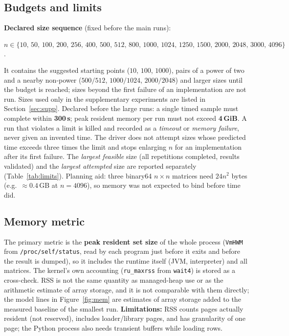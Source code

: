\subsection{Budgets and limits}
\label{sec:budgets}
\textbf{Declared size sequence} (fixed before the main runs):
\begin{center}$n\in\{10,\,50,\,100,\,200,\,256,\,400,\,500,\,512,\,800,\,1000,\,1024,\,1250,\,1500,\,2000,\,2048,\,3000,\,4096\}$.\end{center}
It contains the suggested starting points ($10$, $100$, $1000$), pairs of a power of two and a nearby non-power ($500/512$, $1000/1024$, $2000/2048$) and
larger sizes until the budget is reached; sizes beyond the first failure of an implementation are not run. Sizes used only in the supplementary experiments are listed in Section~\ref{sec:supp}.
Declared before the large runs: a single timed sample must complete within \textbf{300\,s}; peak resident memory per
run must not exceed \textbf{4\,GiB}. A run that violates a limit is killed and recorded as a \emph{timeout} or
\emph{memory failure}, never given an invented time. The driver does not attempt sizes whose predicted time exceeds
three times the limit and stops enlarging $n$ for an implementation after its first failure. The \emph{largest
feasible} size (all repetitions completed, results validated) and the \emph{largest attempted} size are reported
separately (Table~\ref{tab:limits}). Planning aid: three binary64 $n\times n$ matrices need $24n^2$ bytes
(e.g.\ $\approx 0.4$\,GB at $n=4096$), so memory was not expected to bind before time did.

\subsection{Memory metric}
The primary metric is the \textbf{peak resident set size} of the whole process (\texttt{VmHWM} from
\texttt{/proc/self/status}, read by each program just before it exits and before the result is dumped), so it
includes the runtime itself (JVM, interpreter) and all matrices. The kernel's own accounting
(\texttt{ru\_maxrss} from \texttt{wait4}) is stored as a cross-check. RSS is not the same quantity as managed-heap use
or as the arithmetic estimate of array storage, and it is not comparable with them directly; the model
lines in Figure~\ref{fig:mem} are estimates of array storage added to the measured baseline of the smallest run.
\textbf{Limitations:} RSS counts pages actually resident (not reserved), includes loader/library pages, and has
granularity of one page; the Python process also needs transient buffers while loading rows.

